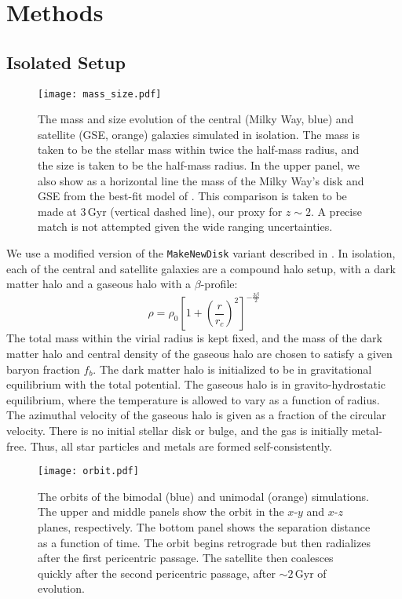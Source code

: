 \documentclass[linenumbers, twocolumn]{aastex631}
\newcommand{\Gyr}{\ensuremath{\textrm{Gyr}}}
\begin{document}
\section{Methods}\label{sec:methods}
\subsection{Isolated Setup}\label{ssec:iso_setup}
\begin{figure}
    \centering
    \texttt{[image: mass\_size.pdf]}
    \caption{The mass and size evolution of the central (Milky Way, blue) and satellite (GSE, orange) galaxies simulated in isolation. The mass is taken to be the stellar mass within twice the half-mass radius, and the size is taken to be the half-mass radius. In the upper panel, we also show as a horizontal line the mass of the Milky Way's disk and GSE from the best-fit model of \citet{2021ApJ...923...92N}. This comparison is taken to be made at $3\,\Gyr$ (vertical dashed line), our proxy for $z\sim2$. A precise match is not attempted given the wide ranging uncertainties.}
    \label{fig:mass_size}
\end{figure}

We use a modified version of the \texttt{MakeNewDisk} variant described in \citet{2023MNRAS.tmp.2070B}. In isolation, each of the central and satellite galaxies are a compound halo setup, with a \citet{1990ApJ...356..359H} dark matter halo and a gaseous halo with a $\beta$-profile:
\begin{equation*}
\rho = \rho_0 \left[1 + \left(\frac{r}{r_c}\right)^2\right]^{-\frac{3\beta}{2}}
\end{equation*}
The total mass within the virial radius is kept fixed, and the mass of the dark matter halo and central density of the gaseous halo are chosen to satisfy a given baryon fraction $f_b$. The dark matter halo is initialized to be in gravitational equilibrium with the total potential. The gaseous halo is in gravito-hydrostatic equilibrium, where the temperature is allowed to vary as a function of radius. The azimuthal velocity of the gaseous halo is given as a fraction of the circular velocity. There is no initial stellar disk or bulge, and the gas is initially metal-free. Thus, all star particles and metals are formed self-consistently.

\begin{figure}
    \centering
    \texttt{[image: orbit.pdf]}
    \caption{The orbits of the bimodal (blue) and unimodal (orange) simulations. The upper and middle panels show the orbit in the $x$-$y$ and $x$-$z$ planes, respectively. The bottom panel shows the separation distance as a function of time. The orbit begins retrograde but then radializes after the first pericentric passage. The satellite then coalesces quickly after the second pericentric passage, after $\sim2\,\Gyr$ of evolution.}
    \label{fig:orbit}
\end{figure}
\end{document}

